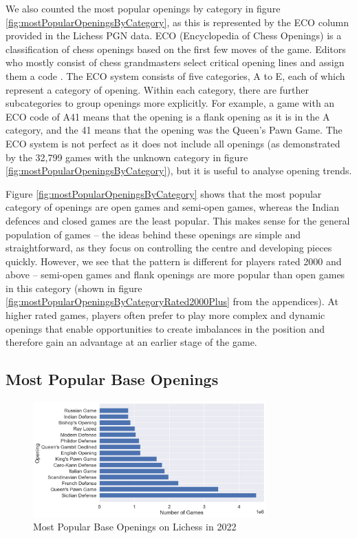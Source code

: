 \documentclass[a4paper, 11pt]{article}
\begin{document}
We also counted the most popular openings by category in figure \ref{fig:mostPopularOpeningsByCategory}, as this is represented by the ECO column provided in the Lichess PGN data. ECO (Encyclopedia of Chess Openings) is a classification of chess openings based on the first few moves of the game. Editors who mostly consist of chess grandmasters select critical opening lines and assign them a code \cite{matanovic1971classification}. The ECO system consists of five categories, A to E, each of which represent a category of opening. Within each category, there are further subcategories to group openings more explicitly. For example, a game with an ECO code of A41 means that the opening is a flank opening as it is in the A category, and the 41 means that the opening was the Queen's Pawn Game. The ECO system is not perfect as it does not include all openings (as demonstrated by the 32,799 games with the unknown category in figure \ref{fig:mostPopularOpeningsByCategory}), but it is useful to analyse opening trends.

Figure \ref{fig:mostPopularOpeningsByCategory} shows that the most popular category of openings are open games and semi-open games, whereas the Indian defences and closed games are the least popular. This makes sense for the general population of games -- the ideas behind these openings are simple and straightforward, as they focus on controlling the centre and developing pieces quickly. However, we see that the pattern is different for players rated 2000 and above -- semi-open games and flank openings are more popular than open games in this category (shown in figure \ref{fig:mostPopularOpeningsByCategoryRated2000Plus} from the appendices). At higher rated games, players often prefer to play more complex and dynamic openings that enable opportunities to create imbalances in the position and therefore gain an advantage at an earlier stage of the game.

\subsection{Most Popular Base Openings}
\begin{figure}[H]
    \centering
    \caption{Most Popular Base Openings on Lichess in 2022}
    \label{fig:mostPopularOpenings}
    \includegraphics[width=0.8\textwidth]{Most Popular Base Openings.png}
\end{figure}
\end{document}
